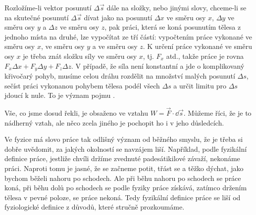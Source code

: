     Rozložíme-li vektor posunutí \(\Delta\vec{s}\) dále na složky, nebo jinými slovy, chceme-li se 
    na skutečné posunutí \(\Delta\vec{s}\) dívat jako na posunutí \(\Delta x\) ve směru osy \(x\), 
    \(\Delta y\) ve směru osy \(y\) a \(\Delta z\) ve směru osy \(z\), pak práci, která se koná 
    posunutím tělesa z jednoho místa na druhé, lze vypočítat ze tří částí: vypočtením práce 
    vykonané ve směru osy \(x\), ve směru osy \(y\) a ve směru osy \(z\). K určení práce 
    vykonané ve směru osy \(x\) je třeba znát složku síly ve směru osy \(x\), tj. \(F_x\) atd., 
    takže práce je rovna \(F_x\Delta x + F_y\Delta y + F_z\Delta z\). V případě, že síla není 
    konstantní a jde o komplikovaný křivočarý pohyb, musíme celou dráhu rozdělit na množství malých 
    posunutí \(\Delta s\), sečíst práci vykonanou pohybem tělesa podél všech \(\Delta s\) a určit 
    limitu pro \(\Delta s\) jdoucí k nule. To je význam pojmu .
    
    Vše, co jsme dosud řekli, je obsaženo ve vztahu \(W=\vec{F}\cdot\dd\vec{s}\). Můžeme říci, že 
    je to nádherný vztah, ale něco zcela jiného je pochopit ho i v jeho důsledcích.
    
    Ve fyzice má slovo práce tak odlišný význam od běžného smyslu, že je třeba si dobře uvědomit, 
    za jakých okolností se navzájem liší. Například, podle fyzikální definice práce, jestliže 
    chvíli držíme zvednuté padesátikilové závaží, nekonáme práci. Naproti tomu je jasné, že se 
    začneme potit, třást se a těžko dýchat, jako bychom běželi nahoru po schodech. Ale při běhu 
    nahoru po schodech se práce koná, při běhu dolů po schodech se podle fyziky práce získává, 
    zatímco držením tělesa v pevné poloze, se práce nekoná. Tedy fyzikální definice práce se liší 
    od fyziologické definice z důvodů, které stručně prozkoumáme.
    
